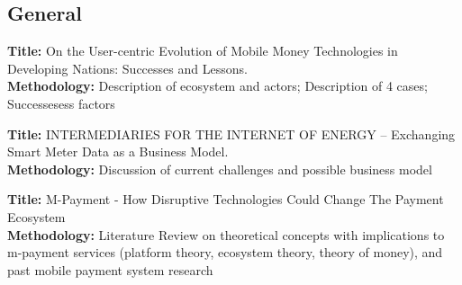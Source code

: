 \documentclass[a4paper, 12pt]{scrartcl}
\begin{document}
\subsection{General}

\textbf{Title:} On the User-centric Evolution of Mobile Money Technologies in Developing Nations: Successes and Lessons. \parencite{dibia2014evolution} \\
\textbf{Methodology:} Description of ecosystem and actors; Description of  4 cases; Successesess factors

\textbf{Title:} INTERMEDIARIES FOR THE INTERNET OF ENERGY – Exchanging Smart Meter Data as a Business Model. \parencite{struker2011intermediaries} \\
\textbf{Methodology:} Discussion of current challenges and possible business model

\textbf{Title:} M-Payment - How Disruptive Technologies Could Change The Payment Ecosystem \parencite{dahlberg2015m} \\
\textbf{Methodology:} Literature Review on theoretical concepts with implications to m-payment services (platform theory, ecosystem theory, theory of money), and past mobile payment system research

\printbibliography
\end{document}

